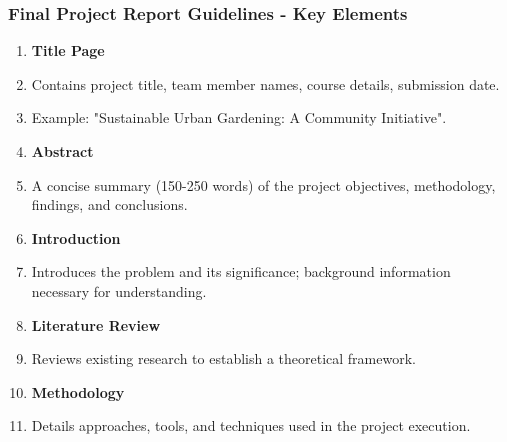 \documentclass[aspectratio=169]{beamer}
\begin{document}
\begin{frame}[fragile]
    \frametitle{Final Project Report Guidelines - Key Elements}
    
    \begin{enumerate}
        \item \textbf{Title Page}
            \item Contains project title, team member names, course details, submission date.
            \item Example: "Sustainable Urban Gardening: A Community Initiative".
        
        \item \textbf{Abstract}
            \item A concise summary (150-250 words) of the project objectives, methodology, findings, and conclusions.
        
        \item \textbf{Introduction}
            \item Introduces the problem and its significance; background information necessary for understanding.
        
        \item \textbf{Literature Review}
            \item Reviews existing research to establish a theoretical framework.
        
        \item \textbf{Methodology}
            \item Details approaches, tools, and techniques used in the project execution.
    \end{enumerate}
    
\end{frame}
\end{document}
